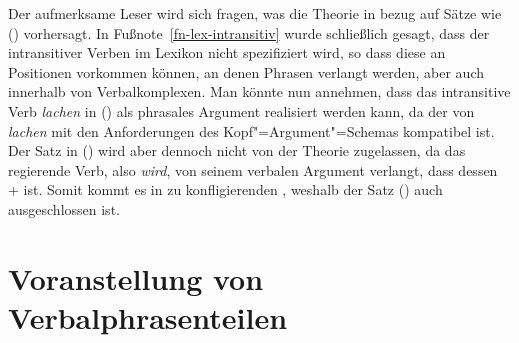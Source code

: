 \noindent
Der aufmerksame Leser wird sich fragen, was die Theorie in bezug auf Sätze wie () vorhersagt.%
\z
In Fußnote~\ref{fn-lex-intransitiv} wurde schließlich gesagt, dass der \lexw intransitiver Verben
im Lexikon nicht spezifiziert wird, so dass diese an Positionen vorkommen können, an denen Phrasen
verlangt werden, aber auch innerhalb von Verbalkomplexen. Man könnte nun annehmen, dass das intransitive Verb
\emph{lachen} in () als phrasales Argument realisiert werden kann, da der \lexw von \emph{lachen}
mit den Anforderungen des Kopf"=Argument"=Schemas kompatibel ist. Der Satz in () wird aber dennoch
nicht von der Theorie zugelassen, da das regierende Verb, also \emph{wird}, von seinem verbalen Argument verlangt,
dass dessen \lexw + ist. Somit kommt es in \kasen zu konfligierenden \lexwen, 
weshalb der Satz () auch ausgeschlossen ist.


\section{Voranstellung von Verbalphrasenteilen}
\label{sec-pvp}

